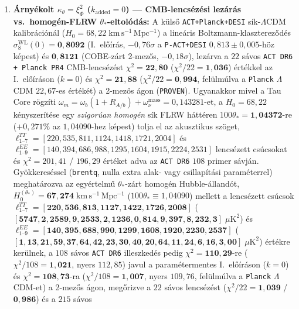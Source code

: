 \documentclass[11pt,a4paper]{article}
\begin{document}
\begin{enumerate}
  \item \textbf{Árnyékolt $\kappa_\theta = \xi_\Phi^2$ ($k_{\mathrm{added}} = 0$) — CMB-lencsézési lezárás vs.\ homogén-FLRW $\theta_*$-eltolódás:} A külső \texttt{ACT+Planck+DESI} sík-$\Lambda$CDM kalibrációnál ($H_0 = 68{,}22\;\mathrm{km\,s^{-1}\,Mpc^{-1}}$) a lineáris Boltzmann-klasztereződés $\sigma_8^{\mathrm{WL}}(0) = \mathbf{0{,}8092}$ (I.~előírás, $-0{,}76\sigma$ a {\upshape\texttt{P-ACT+DESI}} $0{,}813 \pm 0{,}005$-höz képest) és $\mathbf{0{,}8121}$ (COBE-zárt 2-mezős, $-0{,}18\sigma$), lezárva a $22$ sávos {\upshape\texttt{ACT DR6 + Planck PR4}} CMB-lencsézést $\chi^2 = \mathbf{22{,}80}$ ($\chi^2/22 = \mathbf{1{,}036}$) értékkel az I.~előíráson ($k=0$) és $\chi^2 = \mathbf{21{,}88}$ ($\chi^2/22 = \mathbf{0{,}994}$, felülmúlva a \texttt{Planck} $\Lambda$CDM $22{,}67$-es értékét) a 2-mezős ágon ({\upshape\texttt{PROVEN}}). Ugyanakkor mivel a Tau Core rögzíti $\omega_m = \omega_b(1 + R_{A/b}) + \omega_\nu^{\mathrm{mass}} = 0{,}143281$-et, a $H_0 = 68{,}22$ kényszerítése egy \emph{szigorúan homogén} sík FLRW háttéren $100\theta_* = \mathbf{1{,}04372}$-re ($+0{,}271\%$ az $1{,}04090$-hez képest) tolja el az akusztikus szöget, $\ell_{1\text{--}7}^{TT} = [220,\allowbreak 535,\allowbreak 811,\allowbreak 1124,\allowbreak 1418,\allowbreak 1721,\allowbreak 2004]$ és $\ell_{1\text{--}9}^{EE} = [140,\allowbreak 394,\allowbreak 686,\allowbreak 988,\allowbreak 1295,\allowbreak 1604,\allowbreak 1915,\allowbreak 2224,\allowbreak 2531]$ lencsézett csúcsokat és $\chi^2 = 201{,}41$ / $196{,}29$ értéket adva az {\upshape\texttt{ACT DR6}} $108$ primer sávján. Gyökkereséssel (\texttt{brentq}, nulla extra alak- vagy csillapítási paraméterrel) meghatározva az egyértelmű $\theta_*$-zárt homogén Hubble-állandót, $H_0^{(\theta_*)} = \mathbf{67{,}274\;\mathrm{km\,s^{-1}\,Mpc^{-1}}}$ ($100\theta_* \equiv 1{,}04090$) mellett a lencsézett csúcsok $\ell_{1\text{--}7}^{TT} = [\mathbf{220},\allowbreak \mathbf{536},\allowbreak \mathbf{813},\allowbreak \mathbf{1127},\allowbreak \mathbf{1422},\allowbreak \mathbf{1726},\allowbreak \mathbf{2008}]$ ($[\mathbf{5747{,}2},\allowbreak \mathbf{2589{,}9},\allowbreak \mathbf{2533{,}2},\allowbreak \mathbf{1236{,}0},\allowbreak \mathbf{814{,}9},\allowbreak \mathbf{397{,}8},\allowbreak \mathbf{232{,}3}]\;\mu\mathrm{K}^2$) és $\ell_{1\text{--}9}^{EE} = [\mathbf{140},\allowbreak \mathbf{395},\allowbreak \mathbf{688},\allowbreak \mathbf{990},\allowbreak \mathbf{1299},\allowbreak \mathbf{1608},\allowbreak \mathbf{1920},\allowbreak \mathbf{2230},\allowbreak \mathbf{2537}]$ ($[\mathbf{1{,}13},\allowbreak \mathbf{21{,}59},\allowbreak \mathbf{37{,}64},\allowbreak \mathbf{42{,}23},\allowbreak \mathbf{30{,}40},\allowbreak \mathbf{20{,}64},\allowbreak \mathbf{11{,}24},\allowbreak \mathbf{6{,}16},\allowbreak \mathbf{3{,}00}]\;\mu\mathrm{K}^2$) értékre kerülnek, a $108$ sávos {\upshape\texttt{ACT DR6}} illeszkedés pedig $\chi^2 = \mathbf{110{,}29}$-re ($\chi^2/108 = \mathbf{1{,}021}$, nyers $112{,}85$) javul a paramétermentes I.~előíráson ($k=0$) és $\chi^2 = \mathbf{108{,}73}$-ra ($\chi^2/108 = \mathbf{1{,}007}$, nyers $109{,}76$, felülmúlva a \texttt{Planck} $\Lambda$CDM-et) a 2-mezős ágon, megőrizve a $22$ sávos lencsézést ($\chi^2/22 = \mathbf{1{,}039}$ / $\mathbf{0{,}986}$) és a $215$ sávos 
\end{enumerate}
\end{document}
